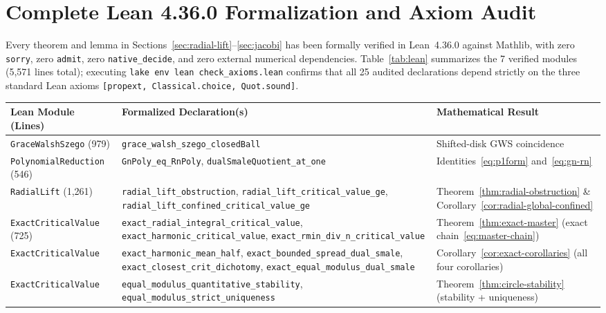 \documentclass[11pt,a4paper]{article}
\theoremstyle{definition}
\theoremstyle{remark}
\begin{document}
\section{Complete Lean 4.36.0 Formalization and Axiom Audit}
\label{sec:lean}

Every theorem and lemma in Sections~\ref{sec:radial-lift}--\ref{sec:jacobi} has been formally verified in Lean~4.36.0 against Mathlib, with zero \texttt{sorry}, zero \texttt{admit}, zero \texttt{native\_decide}, and zero external numerical dependencies. Table~\ref{tab:lean} summarizes the 7 verified modules (5,571 lines total); executing \texttt{lake env lean check\_axioms.lean} confirms that all 25 audited declarations depend strictly on the three standard Lean axioms \texttt{[propext, Classical.choice, Quot.sound]}.

\begin{table}[h]
\centering
\scriptsize
\begin{tabular}{@{} >{\raggedright\arraybackslash}p{3.1cm} >{\raggedright\arraybackslash}p{6.3cm} >{\raggedright\arraybackslash}p{5.0cm} @{}}
\toprule
Lean Module (Lines) & Formalized Declaration(s) & Mathematical Result \\
\midrule
\texttt{GraceWalshSzego} (979) & \texttt{grace\_walsh\_szego\_closedBall} & Shifted-disk GWS coincidence \\
\texttt{PolynomialReduction} (546) & \texttt{GnPoly\_eq\_RnPoly}, \texttt{dualSmaleQuotient\_at\_one} & Identities~\eqref{eq:p1form} and~\eqref{eq:gn-rn} \\
\texttt{RadialLift} (1,261) & \texttt{radial\_lift\_obstruction}, \texttt{radial\_lift\_critical\_value\_ge}, \texttt{radial\_lift\_confined\_critical\_value\_ge} & Theorem~\ref{thm:radial-obstruction} \& Corollary~\ref{cor:radial-global-confined} \\
\texttt{ExactCriticalValue} (725) & \texttt{exact\_radial\_integral\_critical\_value}, \texttt{exact\_harmonic\_critical\_value}, \texttt{exact\_rmin\_div\_n\_critical\_value} & Theorem~\ref{thm:exact-master} (exact chain~\eqref{eq:master-chain}) \\
\texttt{ExactCriticalValue} & \texttt{exact\_harmonic\_mean\_half}, \texttt{exact\_bounded\_spread\_dual\_smale}, \texttt{exact\_closest\_crit\_dichotomy}, \texttt{exact\_equal\_modulus\_dual\_smale} & Corollary~\ref{cor:exact-corollaries} (all four corollaries) \\
\texttt{ExactCriticalValue} & \texttt{equal\_modulus\_quantitative\_stability}, \texttt{equal\_modulus\_strict\_uniqueness} & Theorem~\ref{thm:circle-stability} (stability + uniqueness) \\

\end{tabular}
\end{table}
\end{document}
